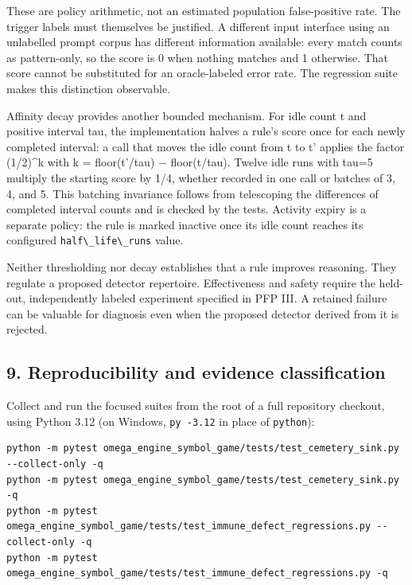 \documentclass[
  11pt,
]{article}
\newcommand{\passthrough}[1]{#1}
\begin{document}
These are policy arithmetic, not an estimated population false-positive
rate. The trigger labels must themselves be justified. A different input
interface using an unlabelled prompt corpus has different information
available: every match counts as pattern-only, so the score is 0 when
nothing matches and 1 otherwise. That score cannot be substituted for an
oracle-labeled error rate. The regression suite makes this distinction
observable.

Affinity decay provides another bounded mechanism. For idle count t and
positive interval tau, the implementation halves a rule's score once for
each newly completed interval: a call that moves the idle count from t
to t' applies the factor (1/2)\^{}k with k = floor(t'/tau) −
floor(t/tau). Twelve idle runs with tau=5 multiply the starting score by
1/4, whether recorded in one call or batches of 3, 4, and 5. This
batching invariance follows from telescoping the differences of
completed interval counts and is checked by the tests. Activity expiry
is a separate policy: the rule is marked inactive once its idle count
reaches its configured \passthrough{\lstinline!half\_life\_runs!} value.

Neither thresholding nor decay establishes that a rule improves
reasoning. They regulate a proposed detector repertoire. Effectiveness
and safety require the held-out, independently labeled experiment
specified in PFP III. A retained failure can be valuable for diagnosis
even when the proposed detector derived from it is rejected.

\subsection{9. Reproducibility and evidence
classification}\label{reproducibility-and-evidence-classification}

Collect and run the focused suites from the root of a full repository
checkout, using Python 3.12 (on Windows,
\passthrough{\lstinline!py -3.12!} in place of
\passthrough{\lstinline!python!}):

\begin{lstlisting}
python -m pytest omega_engine_symbol_game/tests/test_cemetery_sink.py --collect-only -q
python -m pytest omega_engine_symbol_game/tests/test_cemetery_sink.py -q
python -m pytest omega_engine_symbol_game/tests/test_immune_defect_regressions.py --collect-only -q
python -m pytest omega_engine_symbol_game/tests/test_immune_defect_regressions.py -q
\end{lstlisting}
\end{document}
